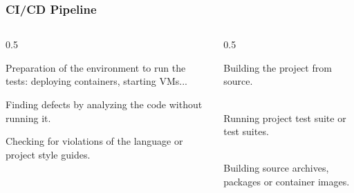 \documentclass[aspectratio=169]{beamer}
\begin{document}
\begin{frame}
	\frametitle{CI/CD Pipeline}
	
\begin{columns}
\begin{column}{0.5\textwidth}
   	\begin{block}{\color{orange}{1. Testing environment}}
   		\vspace{1mm}
Preparation of the environment to run the tests: deploying containers, starting VMs...
	\end{block}
	\begin{block}{\color{orange}{2. Static Analysis}}
   		\vspace{1mm}
Finding defects by analyzing the code without running it.
     \end{block}
         \begin{block}{\color{orange}{3. Code style}}
   		\vspace{1mm}
Checking for violations of the language or project style guides.
     \end{block}
     
\end{column}
\begin{column}{0.5\textwidth}
\begin{block}{\color{orange}{4. Build}}
   		\vspace{1mm}
Building the project from source.\\~
     \end{block}
      \begin{block}{\color{orange}{5. Tests}}
   		\vspace{1mm}
Running project test suite or test suites.\\~
     \end{block}
      \begin{block}{\color{orange}{6. Packaging and Deployment}}
   		\vspace{1mm}
Building source archives, packages or container images.
     \end{block}
\end{column}
\end{columns}
\end{frame}
\end{document}

